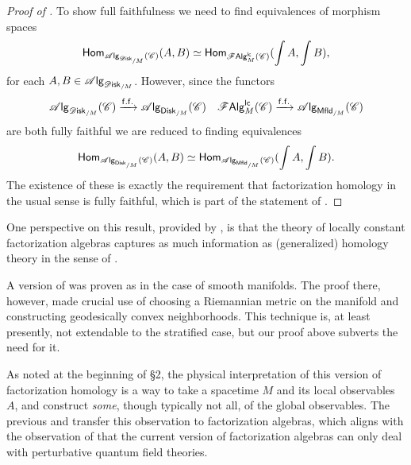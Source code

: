\documentclass[../text]{subfiles}
\begin{document}
\begin{proof}[Proof of {}]
    To show full faithfulness we need to find equivalences of morphism spaces
    \begin{equation}
        \mathsf{Hom}_{\alg{\disk_{/M}} (\catC)} (A, B) \simeq \mathsf{Hom}_{\lcfa_M (\catC)} (\int A, \int B),
    \end{equation}
    for each $A, B \in \alg{\disk_{/M}}$. However, since the functors
    \begin{align}
        &\alg{\disk_{/M}} (\catC) \xrightarrow{\mathsf{f.f.}} \alg{\disk[r]_{/M}} (\catC) &\lcfa_M (\catC) \xrightarrow{\mathsf{f.f.}} \alg{\mfld[r]_{/M}} (\catC)
    \end{align}
    are both fully faithful we are reduced to finding equivalences
    \begin{equation}
        \mathsf{Hom}_{\alg{\disk[r]_{/M}} (\catC)} (A, B) \simeq \mathsf{Hom}_{\alg{\mfld[r]_{/M}} (\catC)} (\int A, \int B).
    \end{equation}
    The existence of these is exactly the requirement that factorization homology in the usual sense is fully faithful, which is part of the statement of \cite[lem.2.17]{aft_fhstrat}.
\end{proof}

\begin{remark}
    One perspective on this result, provided by \cite[thm.2.43]{aft_fhstrat}, is that the theory of locally constant factorization algebras captures as much information as (generalized) homology theory in the sense of \cite[def.2.37]{aft_fhstrat}.
\end{remark}

\begin{remark}
    A version of  was proven as \cite[thm.6]{gtz2014} in the case of smooth manifolds. The proof there, however, made crucial use of choosing a Riemannian metric on the manifold and constructing geodesically convex neighborhoods. This technique is, at least presently, not extendable to the stratified case, but our proof above subverts the need for it. 
\end{remark}

\begin{remark}
    As noted at the beginning of \S2, the physical interpretation of this version of factorization homology is a way to take a spacetime $M$ and its local observables $A$, and construct \emph{some}, though typically not all, of the global observables. The previous  and  transfer this observation to factorization algebras, which aligns with the observation of \cite{cg2016} that the current version of factorization algebras can only deal with perturbative quantum field theories. 
\end{remark}
\end{document}
